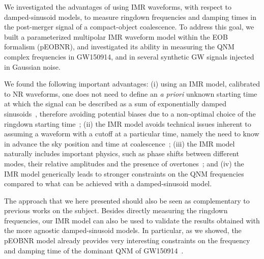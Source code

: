 
We investigated the advantages of using IMR waveforms, with respect to 
damped-sinusoid models, to measure ringdown frequencies and damping times in the post-merger 
signal of a compact-object coalescence. To address this goal, we built a parameterized multipolar IMR waveform model within 
the EOB formalism (pEOBNR), and investigated its ability in measuring the QNM complex frequencies in GW150914, and 
in several synthetic GW signals injected in Gaussian noise.
  
We found the following important advantages: (i) using an IMR model, 
calibrated to NR waveforms, one does not need to define an \emph{a priori} unknown starting time at
which the signal can be described as a sum of exponentially damped
sinusoids~\cite{Gossan:2011ha,Meidam:2014jpa,Cabero:2017avf,Bhagwat:2017tkm,Baibhav:2017jhs,London:2018gaq}, therefore avoiding potential biases due to a non-optimal
choice of the ringdown starting time~\cite{Thrane:2017lqn}; (ii) the IMR model avoids technical
issues inherent to assuming a waveform with a cutoff at a particular
time, namely the need to know in advance the sky position and time at
coalescence~\cite{TheLIGOScientific:2016src,Cabero:2017avf}; (iii) the IMR model naturally includes important physics,
such as phase shifts between different modes, their relative
amplitudes and the presence of overtones~\cite{Buonanno:2006ui,Pan:2011gk}; and (iv) the IMR model
generically leads to stronger constraints on the QNM frequencies
compared to what can be achieved with a damped-sinusoid model.

The approach that we here presented should also be seen as
complementary to previous works on the subject. Besides directly
measuring the ringdown frequencies, our IMR model 
can also be used to validate the results obtained with the more agnostic
damped-sinusoid models. In particular, as we showed, the pEOBNR model already
provides very interesting constraints on the frequency and damping time of the dominant QNM of GW150914~\cite{Abbott:2016blz}.


